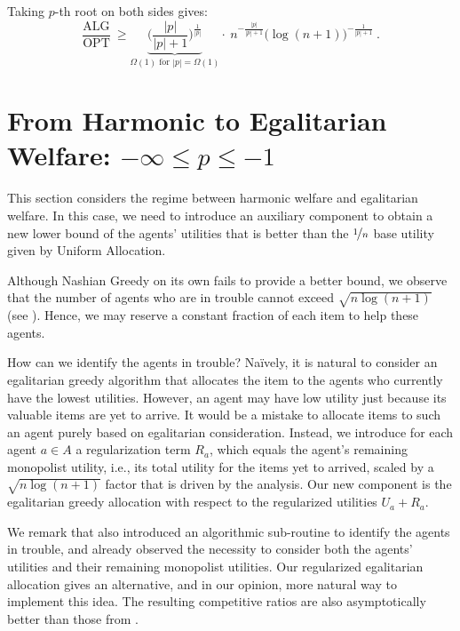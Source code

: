 \documentclass[11pt,letterpaper]{article}
\newcommand{\OPT}{\mathrm{OPT}}
\newcommand{\ALG}{\mathrm{ALG}}
\newcommand{\utility}{U}
\newcommand{\regularizer}{R}
\begin{document}
Taking $p$-th root on both sides gives:
\[
	\frac{\ALG}{\OPT} ~\ge \underbrace{\bigg( \frac{|p|}{|p|+1} \bigg)^{\frac{1}{|p|}}}_{\text{$\Omega(1)$ for $|p| = \Omega(1)$}} \cdot~ n^{-\frac{|p|}{|p|+1}} \big(\log(n+1) \big)^{-\frac{1}{|p|+1}}
	~.
\]


 \section[From Harmonic to Egalitarian Welfare]{From Harmonic to Egalitarian Welfare: $-\infty \le p \le -1$}
\label{sec:harmonic-to-egalitarian}

This section considers the regime between harmonic welfare and egalitarian welfare. 
In this case, we need to introduce an auxiliary component to obtain a new lower bound of the agents' utilities that is better than the $\nicefrac{1}{n}$ base utility given by Uniform Allocation.

Although Nashian Greedy on its own fails to provide a better bound, we observe that the number of agents who are in trouble cannot exceed $\sqrt{n \log (n+1)}$ (see ).
Hence, we may reserve a constant fraction of each item to help these agents.

How can we identify the agents in trouble?
Na\"{i}vely, it is natural to consider an egalitarian greedy algorithm that allocates the item to the agents who currently have the lowest utilities.
However, an agent may have low utility just because its valuable items are yet to arrive.
It would be a mistake to allocate items to such an agent purely based on egalitarian consideration.
Instead, we introduce for each agent $a \in A$ a regularization term $\regularizer_a$, which equals the agent's remaining monopolist utility, i.e., its total utility for the items yet to arrived, scaled by a $\sqrt{n \log (n+1)}$ factor that is driven by the analysis.
Our new component is the egalitarian greedy allocation with respect to the regularized utilities $\utility_a + \regularizer_a$.

We remark that \citet{BarmanKM:AAAI:2022} also introduced an algorithmic sub-routine to identify the agents in trouble, and already observed the necessity to consider both the agents' utilities and their remaining monopolist utilities. 
Our regularized egalitarian allocation gives an alternative, and in our opinion, more natural way to implement this idea.
The resulting competitive ratios are also asymptotically better than those from \citet{BarmanKM:AAAI:2022}.
\end{document}
